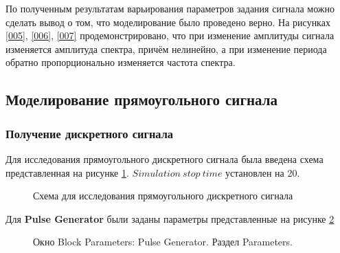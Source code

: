 \documentclass[a4paper,14pt]{extarticle}
\begin{document}
По полученным результатам варьирования параметров задания сигнала 
можно сделать вывод о том, что моделирование было проведено 
верно. На рисунках \ref{005}, \ref{006}, \ref{007} 
продемонстрировано, что при изменение амплитуды сигнала 
изменяется амплитуда спектра, причём нелинейно, а при изменение 
периода обратно пропорционально изменяется частота спектра.

\subsection{Моделирование прямоугольного сигнала}

\subsubsection{Получение дискретного сигнала}

Для исследования прямоугольного дискретного сигнала была введена 
схема представленная на рисунке \ref{008}. $Simulation \ stop \ 
time$ установлен на 20.

\begin{figure}[H]
\caption{Схема для исследования прямоугольного дискретного 
сигнала}
\label{008}
\end{figure}

Для \textbf{Pulse Generator} были заданы параметры представленные 
на рисунке \ref{009}

\begin{figure}[H]
\caption{Окно Block Parameters: Pulse Generator. Раздел 
Parameters.}
\label{009}
\end{figure}
\end{document}
